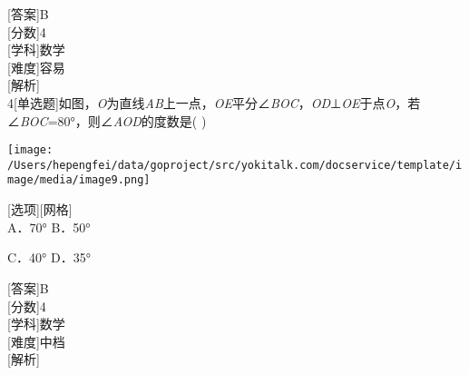 \documentclass[a4paper,12pt,scale=0.8][UTF8]{ctexart}
\begin{document}
{[}答案{]}B \\
{[}分数{]}4 \\
{[}学科{]}数学 \\
{[}难度{]}容易 \\  %
{[}解析{]} \\
4{[}单选题{]}如图，\emph{O}为直线\emph{AB}上一点，\emph{OE}平分∠\emph{BOC}，\emph{OD}⊥\emph{OE}于点\emph{O}，若∠\emph{BOC}=80°，则∠\emph{AOD}的度数是( )

\texttt{[image: /Users/hepengfei/data/goproject/src/yokitalk.com/docservice/template/image/media/image9.png]}

{[}选项{]}{[}网格{]} \\ %

A．70° B．50°

C．40° D．35°

{[}答案{]}B \\
{[}分数{]}4 \\
{[}学科{]}数学 \\
{[}难度{]}中档 \\  %
{[}解析{]} \\
\end{document}

